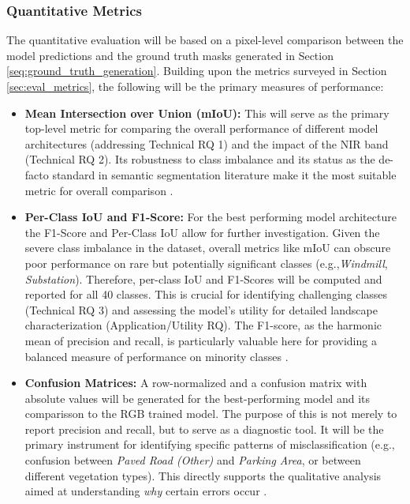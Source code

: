 \documentclass{report}
\begin{document}
\subsubsection{Quantitative Metrics}
The quantitative evaluation will be based on a pixel-level comparison between the model predictions and the ground truth masks generated in Section \ref{seq:ground_truth_generation}. Building upon the metrics surveyed in Section \ref{sec:eval_metrics}, the following will be the primary measures of performance:
\begin{itemize} 
    \item\textbf{Mean Intersection over Union (mIoU):} This will serve as the primary top-level metric for comparing the overall performance of different model architectures (addressing Technical RQ 1) and the impact of the NIR band (Technical RQ 2). Its robustness to class imbalance and its status as the de-facto standard in semantic segmentation literature make it the most suitable metric for overall comparison \parencite [p.~31.]{LeiEtAlDeeplearningimplementationimagesegmentationagriculturalapplicationscomprehensivereview2024}.
    \item\textbf{Per-Class IoU and F1-Score:} For the best performing model architecture the F1-Score and Per-Class IoU allow for further investigation. Given the severe class imbalance in the dataset, overall metrics like mIoU can obscure poor performance on rare but potentially significant classes (e.g.,\textit{Windmill}, \textit{Substation}). Therefore, per-class IoU and F1-Scores will be computed and reported for all 40 classes. This is crucial for identifying challenging classes (Technical RQ 3) and assessing the model's utility for detailed landscape characterization (Application/Utility RQ). The F1-score, as the harmonic mean of precision and recall, is particularly valuable here for providing a balanced measure of performance on minority classes \parencite [p.~9.]{SertelEtAlLandUseLandCoverMappingUsingDeepLearningBasedSegmentationApproachesVHRWorldview3Images2022}.
    \item\textbf{Confusion Matrices:} A row-normalized and a confusion matrix with absolute values will be generated for the best-performing model and its comparisson to the RGB trained model. The purpose of this is not merely to report precision and recall, but to serve as a diagnostic tool. It will be the primary instrument for identifying specific patterns of misclassification (e.g., confusion between \textit{Paved Road (Other)} and \textit{Parking Area}, or between different vegetation types). This directly supports the qualitative analysis aimed at understanding \textit{why} certain errors occur \parencite [p.~8f.]{SertelEtAlLandUseLandCoverMappingUsingDeepLearningBasedSegmentationApproachesVHRWorldview3Images2022}.
\end{itemize}
\end{document}
